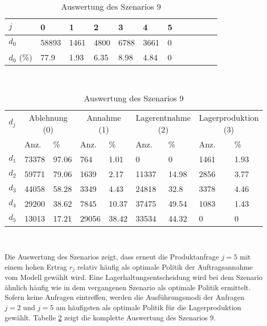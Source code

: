 \begin{table}[h!]
\renewcommand{\arraystretch}{1.5}
  \begin{center}
    \caption{Auswertung des Szenarios 9}  \label{AS9}
    \vspace*{3mm}
    \begin{tabular}{l l l l l l l l l l l l }  \hline 
         $j$ & 0 & 1  & 2 & 3 & 4  & 5   \\  \hline
$d_{0}$ &  58893 &  1461 &  4800 &  6788 &  3661 &  0 \\
$d_{0}$ (\%) &   77.9 &  1.93 &  6.35 &  8.98 &  4.84 &  0 \\\hline
    \end{tabular} \\[3mm]
        \begin{tabular}{ l l l l l l l l l}   \hline    %
    $d_j$ & \multicolumn{2}{c}{Ablehnung (0)} & \multicolumn{2}{c}{Annahme (1)}  & \multicolumn{2}{c}{Lagerentnahme (2)} & \multicolumn{2}{c}{Lagerproduktion (3)}\\
    & Anz. & \% & Anz. & \% & Anz. & \% & Anz. & \% \\ \hline 
$d_{1}$ &  73378 &  97.06 &    764 &   1.01 &    0 &    0 &  1461 &  1.93 \\
$d_{2}$ &  59771 &  79.06 &   1639 &   2.17 &  11337 &  14.98 &  2856 &  3.77 \\
$d_{3}$ &  44058 &  58.28 &   3349 &   4.43 &  24818 &   32.8 &  3378 &  4.46 \\
$d_{4}$ &  29200 &  38.62 &   7845 &  10.37 &  37475 &  49.54 &  1083 &  1.43 \\
$d_{5}$ &  13013 &  17.21 &  29056 &  38.42 &  33534 &  44.32 &   0 &   0 \\
          \hline
   \end{tabular} \\[3mm]
     \end{center}
\end{table}

Die Auswertung des Szenarios zeigt, dass erneut die Produktanfrage $j=5$ mit einem hohen Ertrag $r_j$ relativ häufig als optimale Politik der Auftragsannahme vom Modell gewählt wird. Eine Lagerhaltungsentscheidung wird bei dem Szenario ähnlich häufig wie in dem vergangenen Szenario als optimale Politik ermittelt. Sofern keine Anfragen eintreffen, werden die Ausführungsmodi der Anfragen $j=2$ und $j=5$ am häufigsten als optimale Politik für die Lagerproduktion gewählt. Tabelle \ref{AS9} zeigt die komplette Auswertung des Szenarios 9.



